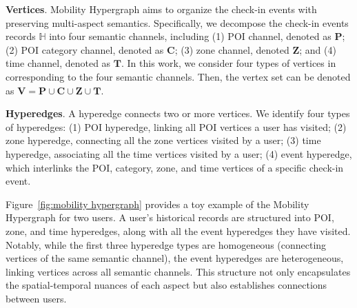\documentclass[letterpaper]{article} %
\begin{document}
\noindent \textbf{Vertices}.
Mobility Hypergraph aims to organize the check-in events with preserving multi-aspect semantics.
Specifically, we decompose the check-in events records $\mathbb{H}$ into four semantic channels, including (1) POI channel, denoted as $\mathbf{P}$; (2) POI category channel, denoted as $\mathbf{C}$; (3) zone channel, denoted $\mathbf{Z}$; and (4) time channel, denoted as $\mathbf{T}$.
In this work, we consider four types of vertices in corresponding to the four semantic channels.
Then, the vertex set can be denoted as $\mathbf{V}= \mathbf{P} \cup \mathbf{C} \cup \mathbf{Z} \cup  \mathbf{T}$.



\noindent \textbf{Hyperedges}.
A hyperedge connects two or more vertices. We identify four types of hyperedges:
(1) POI hyperedge, linking all POI vertices a user has visited;
(2) zone hyperedge, connecting all the zone vertices visited by a user;
(3) time hyperedge, associating all the time vertices visited by a user;
(4) event hyperedge, which interlinks the POI, category, zone, and time vertices of a specific check-in event.


Figure~\ref{fig:mobility hypergraph} provides a toy example of the Mobility Hypergraph for two users. A user's historical records are structured into POI, zone, and time hyperedges, along with all the event hyperedges they have visited. Notably, while the first three hyperedge types are homogeneous (connecting vertices of the same semantic channel), the event hyperedges are heterogeneous, linking vertices across all semantic channels. This structure not only encapsulates the spatial-temporal nuances of each aspect but also establishes connections between users.
\end{document}
